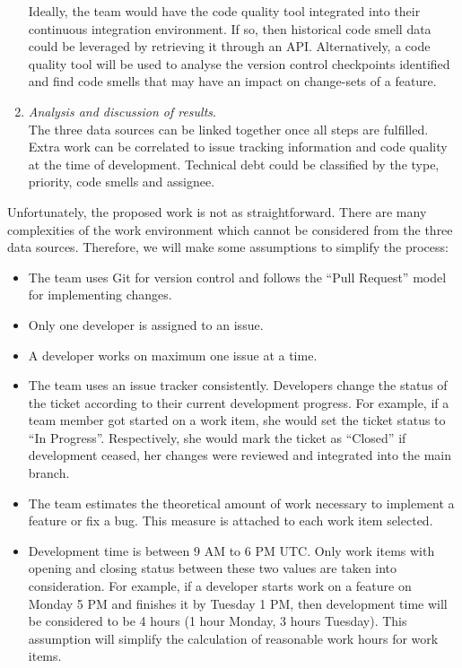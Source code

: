\begin{enumerate}
	      Ideally, the team would have the code quality tool integrated into
	      their continuous integration environment. If so, then historical
	      code smell data could be leveraged by retrieving it through an API.
	      Alternatively, a code quality tool will be used to analyse the
	      version control checkpoints identified and find code smells that may
	      have an impact on change-sets of a feature.

	\item \textit{Analysis and discussion of results}.\\
	      The three data sources can be linked together once all steps are
	      fulfilled. Extra work can be correlated to issue tracking
	      information and code quality at the time of development. Technical
	      debt could be classified by the type, priority, code smells and
	      assignee.
\end{enumerate}

Unfortunately, the proposed work is not as straightforward. There are many
complexities of the work environment which cannot be considered from the three
data sources. Therefore, we will make some assumptions to simplify the process:
\begin{itemize}
	\item The team uses Git for version control and follows the ``Pull
	      Request'' model for implementing changes.
	\item Only one developer is assigned to an issue.
	\item A developer works on maximum one issue at a time.
	\item The team uses an issue tracker consistently. Developers change the
	      status of the ticket according to their current development
	      progress. For example, if a team member got started on a work item,
	      she would set the ticket status to ``In Progress''. Respectively,
	      she would mark the ticket as ``Closed'' if development ceased, her
	      changes were reviewed and integrated into the main branch.
	\item The team estimates the theoretical amount of work necessary to
	      implement a feature or fix a bug. This measure is attached to each
	      work item selected.
	\item Development time is between 9 AM to 6 PM UTC. Only work items with
	      opening and closing status between these two values are taken into
	      consideration. For example, if a developer starts work on a feature
	      on Monday 5 PM and finishes it by Tuesday 1 PM, then development
	      time will be considered to be 4 hours (1 hour Monday, 3 hours
	      Tuesday). This assumption will simplify the calculation of
	      reasonable work hours for work items.
\end{itemize}

